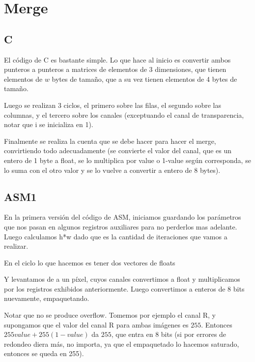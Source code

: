 \section{Merge}

\subsection{C}
El código de C es bastante simple. Lo que hace al inicio es convertir ambos punteros a punteros a matrices de elementos de 3 dimensiones, que tienen elementos de $w$ bytes de tamaño, que a su vez tienen elementos de 4 bytes de tamaño.

Luego se realizan 3 ciclos, el primero sobre las filas, el segundo sobre las columnas, y el tercero sobre los canales (exceptuando el canal de transparencia, notar que i se inicializa en 1).

Finalmente se realiza la cuenta que se debe hacer para hacer el merge, convirtiendo todo adecuadamente (se convierte el valor del canal, que es un entero de 1 byte a float, se lo multiplica por value o 1-value según corresponda, se lo suma con el otro valor y se lo vuelve a convertir a entero de 8 bytes).

\subsection{ASM1}

En la primera versión del código de ASM, iniciamos guardando los parámetros que nos pasan en algunos registros auxiliares para no perderlos mas adelante.
Luego calculamos h*w dado que es la cantidad de iteraciones que vamos a realizar.

En el ciclo lo que hacemos es tener dos vectores de floats



Y levantamos de a un píxel, cuyos canales convertimos a float y multiplicamos por los registros exhibidos anteriormente. Luego convertimos a enteros de 8 bits nuevamente, empaquetando.

Notar que no se produce overflow. Tomemos por ejemplo el canal R, y supongamos que el valor del canal R para ambas imágenes es $255$.
Entonces $255value + 255(1-value)$ da $255$, que entra en 8 bits (si por errores de redondeo diera más, no importa, ya que el empaquetado lo hacemos saturado, entonces se queda en 255).

